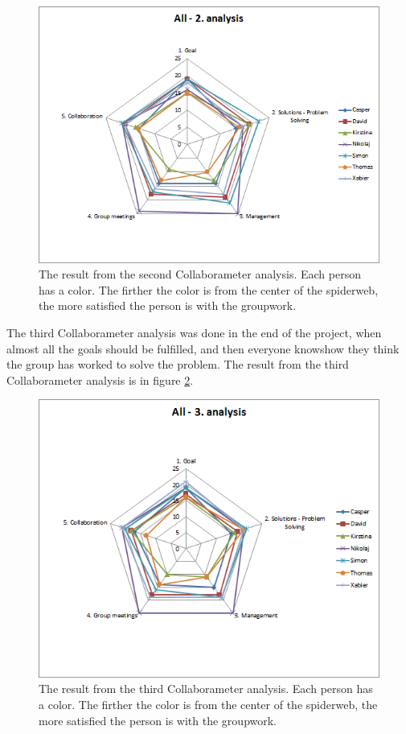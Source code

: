 \begin{figure}
\centering
\includegraphics[width=0.7\linewidth]{./graphics/2analysisCollaborameter}
\caption{The result from the second Collaborameter analysis. Each person has a color. The firther the color is from the center of the spiderweb, the more satisfied the person is with the groupwork.}
\label{fig:2analysisCollaborameter}
\end{figure}

The third Collaborameter analysis was done in the end of the project, when almost all the goals should be fulfilled, and then everyone knowshow they think the group has worked to solve the problem. The result from the third Collaborameter analysis is in figure \ref{fig:3analysisCollaborameter}.

\begin{figure}
\centering
\includegraphics[width=0.7\linewidth]{./graphics/3analysisCollaborameter}
\caption{The result from the third Collaborameter analysis. Each person has a color. The firther the color is from the center of the spiderweb, the more satisfied the person is with the groupwork.}
\label{fig:3analysisCollaborameter}
\end{figure}

